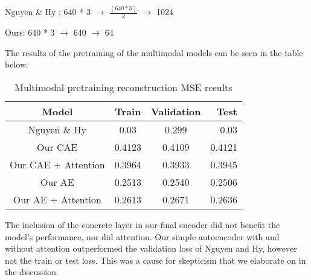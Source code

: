 \documentclass{article}
\begin{document}
Nguyen \& Hy : 640 * 3 $\to$ $\frac{(640 * 3)}{2}$ $\to$ 1024

Ours: 640 * 3 $\to$ 640 $\to$ 64

The results of the pretraining of the multimodal models can be seen in the table below.

\begin{table}[h]
    \centering
    \begin{tabular}{|c  c  c  r|} 
 \hline
    \textbf{Model} & \textbf{Train} & \textbf{Validation} & \textbf{Test} \\
    \hline
 Nguyen \& Hy &  0.03 & 0.299 & 0.03\\
 \hline
 Our CAE & 0.4123 & 0.4109 & 0.4121 \\
 \hline
 Our CAE + Attention & 0.3964 & 0.3933 & 0.3945 \\
 \hline
 Our AE & 0.2513 & 0.2540 & 0.2506\\
 \hline
 Our AE + Attention & 0.2613 & 0.2671 & 0.2636\\ 
 \hline
\end{tabular}
    \caption{Multimodal pretraining reconstruction MSE results}
    \label{tab:CAE_pretrain}
\end{table}

The inclusion of the concrete layer in our final encoder did not benefit the model's performance, nor did attention. Our simple autoencoder with and without attention outperformed the validation loss of Nguyen and Hy, however not the train or test loss. This was a cause for skepticism that we elaborate on in the discussion.
\end{document}

